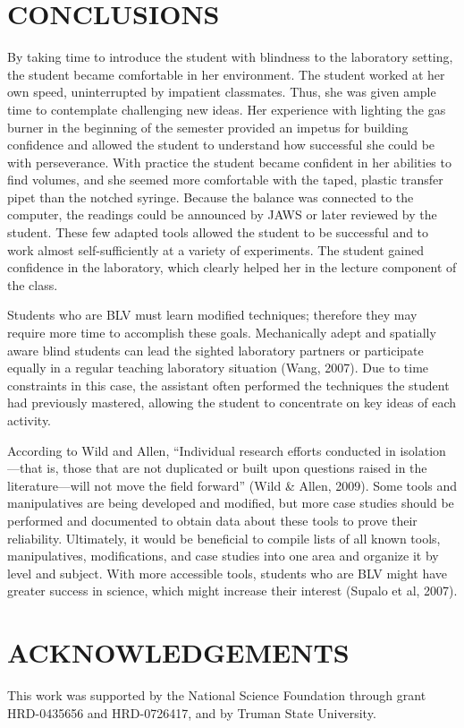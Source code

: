 \documentclass[11.5pt]{sig-alternate} %
\begin{document}
\begin{large}
\section*{CONCLUSIONS}

By taking time to introduce the student with blindness to the laboratory setting, the student became comfortable in her environment. The student worked at her own speed, uninterrupted by impatient classmates. Thus, she was given ample time to contemplate challenging new ideas. Her experience with lighting the gas burner in the beginning of the semester provided an impetus for building confidence and allowed the student to understand how successful she could be with perseverance.  With practice the student became confident in her abilities to find volumes, and she seemed more comfortable with the taped, plastic transfer pipet than the notched syringe. Because the balance was connected to the computer, the readings could be announced by JAWS or later reviewed by the student. These few adapted tools allowed the student to be successful and to work almost self-sufficiently at a variety of experiments.  The student gained confidence in the laboratory, which clearly helped her in the lecture component of the class.  

Students who are BLV must learn modified techniques; therefore they may require more time to accomplish these goals.  Mechanically adept and spatially aware blind students can lead the sighted laboratory partners or participate equally in a regular teaching laboratory situation (Wang, 2007).  Due to time constraints in this case, the assistant often performed the techniques the student had previously mastered, allowing the student to concentrate on key ideas of each activity. 

According to Wild and Allen, “Individual research efforts conducted in isolation—that is, those that are not duplicated or built upon questions raised in the literature—will not move the field forward” (Wild \& Allen, 2009). Some tools and manipulatives are being developed and modified, but more case studies should be performed and documented to obtain data about these tools to prove their reliability. Ultimately, it would be beneficial to compile lists of all known tools, manipulatives, modifications, and case studies into one area and organize it by level and subject.  With more accessible tools, students who are BLV might have greater success in science, which might increase their interest (Supalo et al, 2007).

\section*{ACKNOWLEDGEMENTS}
This work was supported by the National Science Foundation through grant HRD-0435656 and HRD-0726417, and by Truman State University. 

\end{large}
\clearpage
\end{document}
